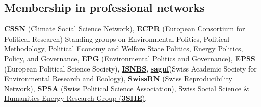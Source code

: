    \subsection{Membership in professional networks}\label{memberships-in-professional-networks}


  \href{https://cssn.org/scholar/g-bruckmann/}{\textbf{CSSN}} (Climate Social Science Network),
 \href{https://ecpr.eu}{\textbf{ECPR}} (European Consortium for Political Research) Standing groups on Environmental Politics, Political Methodology, Political Economy and Welfare State Politics, Energy Politics, Policy, and Governance, \href{https://epgnetwork.org/}{\textbf{EPG}} (Environmental Politics and Governance), \href{https://epssnet.org/}{\textbf{EPSS}} (European Political Science Society), \href{https://isnbs.org/}{\textbf{ISNBS}}, \href{https://saguf.ch/en}{\textbf{saguf}}(Swiss Academic Society for Environmental Research and Ecology), \href{https://www.swissrn.org/contents/academy/\#GraciaBr\%C3\%BCckmann}{\textbf{SwissRN}} (Swiss Reproducibility Network), \href{https://www.svpw-assp.ch/}{\textbf{SPSA}} (Swiss Political Science Association), \href{https://t1p.de/SSHEnergy}{Swiss Social Science \& Humanities Energy Research Group (\textbf{3SHE})}.
